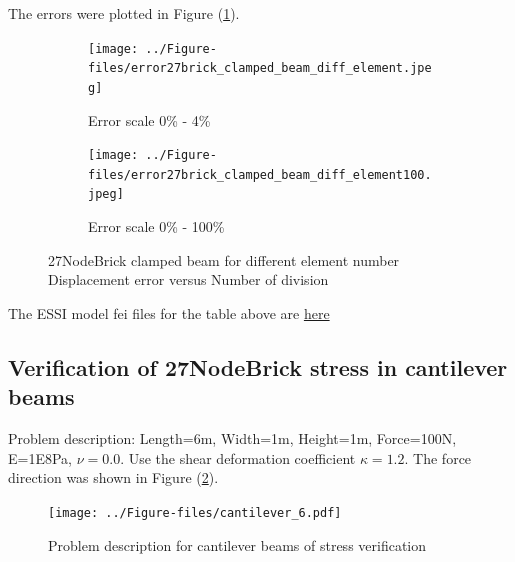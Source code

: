 \documentclass[fleqn,11pt]{article}
\begin{document}

The errors were plotted in Figure (\ref{fig error 27NodeBrick clamped beam for different element number}).


\begin{figure}[H]
  \begin{subfigure}{0.5\textwidth}
    \centering
    \texttt{[image: ../Figure-files/error27brick\_clamped\_beam\_diff\_element.jpeg]}
    \caption{Error scale 0\% - 4\%}
  \end{subfigure}
  \begin{subfigure}{0.5\textwidth}
    \centering
    \texttt{[image: ../Figure-files/error27brick\_clamped\_beam\_diff\_element100.jpeg]}
    \caption{Error scale 0\% - 100\%}
  \end{subfigure}
  \captionsetup{justification=centering,margin=3cm}
  \caption{27NodeBrick clamped beam for different element number\\
      Displacement error   versus   Number of division}
  \label{fig error 27NodeBrick clamped beam for different element number}
\end{figure}


The ESSI model fei files for the table above are \href{https://github.com/yuan-energy/ESSI_Verification/blob/master/27NodeBrick/clamped_beam_cut/clamped_beam_cut.tar.gz?raw=true}{here}

\newpage
\subsection{Verification of 27NodeBrick stress in cantilever beams}





Problem description: Length=6m, Width=1m, Height=1m, Force=100N, E=1E8Pa, $\nu=0.0$. Use the shear deformation coefficient $\kappa=1.2$. The force direction was shown in Figure (\ref{fig Problem description for cantilever beams of stress verification 27}). 

\begin{figure}[H]
  \centering
  \texttt{[image: ../Figure-files/cantilever\_6.pdf]}
  \caption{Problem description for cantilever beams of stress verification}
  \label{fig Problem description for cantilever beams of stress verification 27}
\end{figure}
\end{document}
